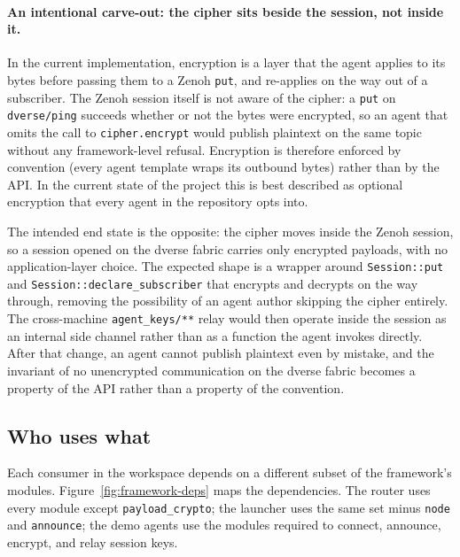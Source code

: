 \documentclass[11pt,a4paper]{article}
\begin{document}
\paragraph{An intentional carve-out: the cipher sits beside the session, not inside it.}
In the current implementation, encryption is a layer that the
agent applies to its bytes before passing them to a Zenoh
\texttt{put}, and re-applies on the way out of a subscriber. The
Zenoh session itself is not aware of the cipher: a \texttt{put}
on \texttt{dverse/ping} succeeds whether or not the bytes were
encrypted, so an agent that omits the call to
\texttt{cipher.encrypt} would publish plaintext on the same topic
without any framework-level refusal. Encryption is therefore
enforced by convention (every agent template wraps its outbound
bytes) rather than by the API. In the current state of the
project this is best described as optional encryption that every
agent in the repository opts into.

The intended end state is the opposite: the cipher moves inside
the Zenoh session, so a session opened on the dverse fabric
carries only encrypted payloads, with no application-layer
choice. The expected shape is a wrapper around \texttt{Session::put}
and \texttt{Session::declare\_subscriber} that encrypts and
decrypts on the way through, removing the possibility of an
agent author skipping the cipher entirely. The cross-machine
\texttt{agent\_keys/**} relay would then operate inside the
session as an internal side channel rather than as a function
the agent invokes directly. After that change, an agent cannot
publish plaintext even by mistake, and the invariant of no
unencrypted communication on the dverse fabric becomes a
property of the API rather than a property of the convention.

\subsection{Who uses what}

Each consumer in the workspace depends on a different subset of
the framework's modules. Figure~\ref{fig:framework-deps} maps
the dependencies. The router uses every module except
\texttt{payload\_crypto}; the launcher uses the same set minus
\texttt{node} and \texttt{announce}; the demo agents use the
modules required to connect, announce, encrypt, and relay
session keys.
\end{document}

